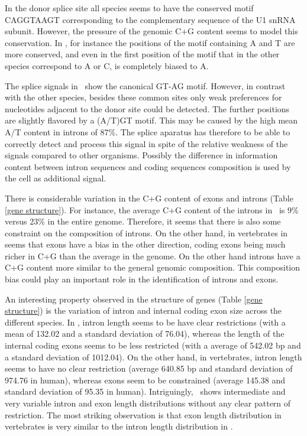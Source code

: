 In the donor splice site all species seems to have the conserved motif
CAGGTAAGT corresponding to the complementary sequence of the U1 snRNA
subunit. However, the pressure of the genomic C+G content seems to
model this conservation. In \Dicty, for instance the positions of the
motif containing A and T are more conserved, and even in the first
position of the motif that in the other species correspond to A or C,
is completely biased to A.

The splice signals in \Dd\ show the canonical GT-AG motif. However,
in contrast with the other species, besides these common sites only
weak preferences for nucleotides adjacent to the donor site could be
detected. The further positions are slightly flavored by a (A/T)GT
motif. This may be caused by the high mean A/T content in introns of
87\%. The splice aparatus has therefore to be able to correctly detect
and process this signal in spite of the relative weakness of the
signals compared to other organisms. Possibly the difference in
information content between intron sequences and coding sequences
composition is used by the cell as additional signal.

There is considerable variation in the C+G content of exons and
introns (Table \ref{gene structure}). For instance, the average C+G
content of the introns in \Dicty\ is 9\% versus 23\% in the
entire genome. Therefore, it seems that there is also some constraint
on the composition of introns. On the other hand, in vertebrates in
seems that exons have a bias in the other direction, coding exons
being much richer in C+G than the average in the genome. On the other
hand introns have a C+G content more similar to the general genomic
composition. This composition bias could play an important role in the
identification of introns and exons.

An interesting property observed in the structure of genes (Table
\ref{gene structure}) is the variation of intron and internal coding 
exon size across the different species. In \Dicty, intron length seems
to be have clear restrictions (with a mean of 132.02 and a standard
deviation of 76.04), whereas the length of the internal coding exons
seems to be less restricted (with a average of 542.02 bp and a
standard deviation of 1012.04). On the other hand, in vertebrates,
intron length seems to have no clear restriction (average 640.85 bp
and standard deviation of 974.76 in human), whereas exons seem to be
constrained (average 145.38 and standard deviation of 95.35 in
human). Intriguingly, \Droso\ shows intermediate and very variable
intron and exon length distributions without any clear pattern of
restriction. The most striking observation is that exon length
distribution in vertebrates is very similar to the intron length
distribution in \Dicty.

